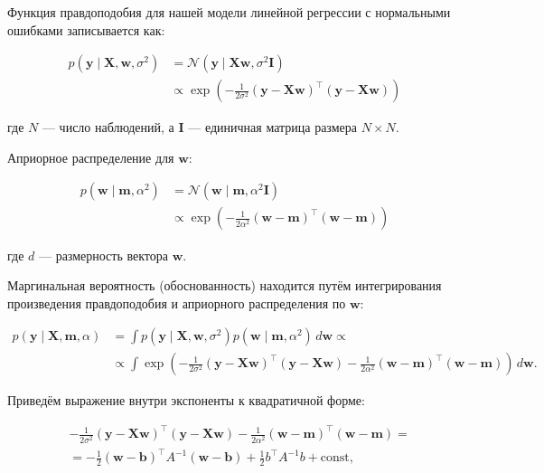 Функция правдоподобия для нашей модели линейной регрессии с нормальными ошибками записывается как:

\begin{align*}
    p(\mathbf{y} \mid \mathbf{X}, \mathbf{w}, \sigma^2) & = \mathcal{N}(\mathbf{y} \mid \mathbf{X}\mathbf{w}, \sigma^2 \mathbf{I})                                                 \\
                                                        & \propto \exp\left(-\frac{1}{2\sigma^2}(\mathbf{y} - \mathbf{X}\mathbf{w})^\top(\mathbf{y} - \mathbf{X}\mathbf{w})\right)
\end{align*}

где $N$ — число наблюдений, а $\mathbf{I}$ — единичная матрица размера $N \times N$.

Априорное распределение для $\mathbf{w}$:

\begin{align*}
    p(\mathbf{w} \mid \mathbf{m}, \alpha^2) & = \mathcal{N}(\mathbf{w} \mid \mathbf{m}, \alpha^2 \mathbf{I})                                       \\
                                            & \propto \exp\left(-\frac{1}{2\alpha^2}(\mathbf{w} - \mathbf{m})^\top(\mathbf{w} - \mathbf{m})\right)
\end{align*}

где $d$ — размерность вектора $\mathbf{w}$.

Маргинальная вероятность (обоснованность) находится путём интегрирования произведения правдоподобия и априорного распределения по $\mathbf{w}$:

\begin{align*}
    p(\mathbf{y} \mid \mathbf{X}, \mathbf{m}, \alpha) & = \int p(\mathbf{y} \mid \mathbf{X}, \mathbf{w}, \sigma^2) p(\mathbf{w} \mid \mathbf{m}, \alpha^2) \, d\mathbf{w} \propto                                                                                                  \\
                                                      & \propto \int \exp\left(-\frac{1}{2\sigma^2}(\mathbf{y} - \mathbf{X}\mathbf{w})^\top(\mathbf{y} - \mathbf{X}\mathbf{w}) - \frac{1}{2\alpha^2}(\mathbf{w} - \mathbf{m})^\top(\mathbf{w} - \mathbf{m})\right) \, d\mathbf{w}.
\end{align*}

Приведём выражение внутри экспоненты к квадратичной форме:

\begin{align*}
     & -\frac{1}{2\sigma^2}(\mathbf{y} - \mathbf{X}\mathbf{w})^\top(\mathbf{y} - \mathbf{X}\mathbf{w}) - \frac{1}{2\alpha^2}(\mathbf{w} - \mathbf{m})^\top(\mathbf{w} - \mathbf{m})= \\
     & = -\frac{1}{2}(\mathbf{w} - \mathbf{b})^\top A^{-1} (\mathbf{w} - \mathbf{b}) + \frac{1}{2} b^\top A^{-1} b + \text{const},
\end{align*}

